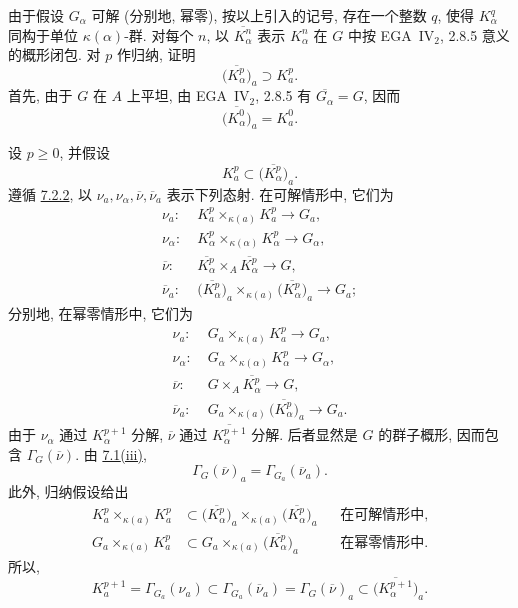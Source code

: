 由于假设 \(G_\alpha\) 可解 (分别地, 幂零),
按以上引入的记号, 存在一个整数 \(q\),
使得 \(K_\alpha^q\) 同构于单位 \(\kappa(\alpha)\)-群.
对每个 \(n\), 以 \(\overline{K_\alpha^n}\) 表示
\(K_\alpha^n\) 在 \(G\) 中按 EGA~IV\(_2\), 2.8.5 意义的概形闭包.
对 \(p\) 作归纳, 证明
\label{form:sga3-VIB-8.4-closure-induction}%
\[
  \bigl(\overline{K_\alpha^p}\bigr)_a
    \supset K_a^p.
\]
首先, 由于 \(G\) 在 \(A\) 上平坦,
由 EGA~IV\(_2\), 2.8.5 有 \(\overline{G_\alpha}=G\), 因而
\[
  \bigl(\overline{K_\alpha^0}\bigr)_a=K_a^0.
\]

设 \(p\geq0\), 并假设
\[
  K_a^p\subset\bigl(\overline{K_\alpha^p}\bigr)_a.
\]
遵循 \hyperref[def:sga3-VIB-7.2.2]{7.2.2},
以 \(\nu_a,\nu_\alpha,\overline{\nu},\overline{\nu}_a\)
表示下列态射. 在可解情形中, 它们为
\label{form:sga3-VIB-8.4-nu-solvable}%
\[
\begin{aligned}
  \nu_a:\;&K_a^p\times_{\kappa(a)}K_a^p
    \longrightarrow G_a,\\
  \nu_\alpha:\;&K_\alpha^p\times_{\kappa(\alpha)}K_\alpha^p
    \longrightarrow G_\alpha,\\
  \overline{\nu}:\;&
    \overline{K_\alpha^p}\times_A\overline{K_\alpha^p}
    \longrightarrow G,\\
  \overline{\nu}_a:\;&
    \bigl(\overline{K_\alpha^p}\bigr)_a
    \times_{\kappa(a)}
    \bigl(\overline{K_\alpha^p}\bigr)_a
    \longrightarrow G_a;
\end{aligned}
\]
分别地, 在幂零情形中, 它们为
\label{form:sga3-VIB-8.4-nu-nilpotent}%
\[
\begin{aligned}
  \nu_a:\;&G_a\times_{\kappa(a)}K_a^p
    \longrightarrow G_a,\\
  \nu_\alpha:\;&G_\alpha\times_{\kappa(\alpha)}K_\alpha^p
    \longrightarrow G_\alpha,\\
  \overline{\nu}:\;&G\times_A\overline{K_\alpha^p}
    \longrightarrow G,\\
  \overline{\nu}_a:\;&
    G_a\times_{\kappa(a)}
    \bigl(\overline{K_\alpha^p}\bigr)_a
    \longrightarrow G_a.
\end{aligned}
\]
由于 \(\nu_\alpha\) 通过 \(K_\alpha^{p+1}\) 分解,
\(\overline{\nu}\) 通过 \(\overline{K_\alpha^{p+1}}\) 分解.
后者显然是 \(G\) 的群子概形,
因而包含 \(\Gamma_G(\overline{\nu})\).
由 \hyperref[concl:sga3-VIB-7.1-iii]{7.1\textup{(iii)}},
\[
  \Gamma_G(\overline{\nu})_a
    =\Gamma_{G_a}(\overline{\nu}_a).
\]
此外, 归纳假设给出
\label{form:sga3-VIB-8.4-induction-inclusions}%
\[
\begin{aligned}
  K_a^p\times_{\kappa(a)}K_a^p
  &\subset
  \bigl(\overline{K_\alpha^p}\bigr)_a
  \times_{\kappa(a)}
  \bigl(\overline{K_\alpha^p}\bigr)_a
  &&\text{在可解情形中},\\
  G_a\times_{\kappa(a)}K_a^p
  &\subset
  G_a\times_{\kappa(a)}
  \bigl(\overline{K_\alpha^p}\bigr)_a
  &&\text{在幂零情形中}.
\end{aligned}
\]
所以,
\label{form:sga3-VIB-8.4-Gamma-chain}%
\[
  K_a^{p+1}
  =\Gamma_{G_a}(\nu_a)
  \subset\Gamma_{G_a}(\overline{\nu}_a)
  =\Gamma_G(\overline{\nu})_a
  \subset\bigl(\overline{K_\alpha^{p+1}}\bigr)_a.
\]

